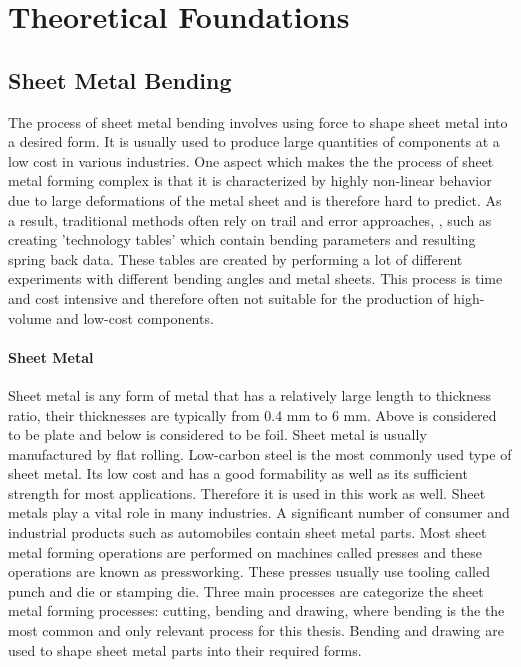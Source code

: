 \chapter{Theoretical Foundations}

\section{Sheet Metal Bending}
The process of sheet metal bending involves using force to shape sheet metal into a desired form. It is usually used to produce large quantities of components at a low cost in various industries. 
\cite[p. 1]{dib_singleensembleclassifiers_2020}
One aspect which makes the the process of sheet metal forming complex is that it is characterized by highly non-linear behavior due to large deformations of the metal sheet and is therefore hard to predict. 
As a result, traditional methods often rely on trail and error approaches, \cite[p. 1]{dib_singleensembleclassifiers_2020}, such as creating 'technology tables' which contain bending parameters and resulting spring back data. These tables are created by performing a lot of different experiments with different bending angles and metal sheets.
This process is time and cost intensive and therefore often not suitable for the production of high-volume and low-cost components.

\subsubsection{Sheet Metal}
Sheet metal is any form of metal that has a relatively large length to thickness ratio, their thicknesses are typically from 0.4 mm to 6 mm. Above is considered to be plate and below is considered to be foil. Sheet metal is usually manufactured by flat rolling.
Low-carbon steel is the most commonly used type of sheet metal. Its low cost and has a good formability as well as its sufficient strength for most applications.
\cite[p. 405]{groover_fundamentalsmodernmanufacturing_2020}
Therefore it is used in this work as well. 
Sheet metals play a vital role in many industries. A significant number of consumer and industrial products such as automobiles contain sheet metal parts.  
Most sheet metal forming operations are performed on machines called presses and these operations are known as pressworking. These presses usually use tooling called punch and die or stamping die. Three main processes are categorize the sheet metal forming processes: cutting, bending and drawing, where bending is the the most common and only relevant process for this thesis.  Bending and drawing are used to shape sheet metal parts into their required forms.
\cite[p. 405]{groover_fundamentalsmodernmanufacturing_2020}

